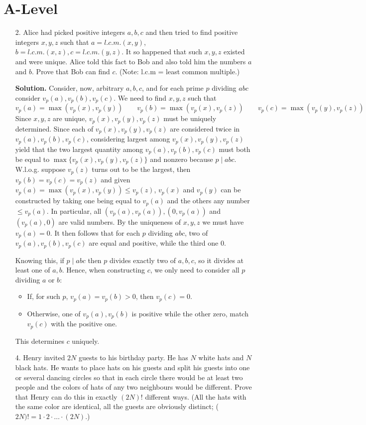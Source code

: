 \documentclass[11pt,a4paper]{article}
\begin{document}
\section*{A-Level}
\begin{enumerate}
	\item[2.] Alice had picked positive integers $a,b,c$ and then tried to find positive integers $x, y, z$ such that $a = l.c.m.(x, y)$, $b = l.c.m.(x, z), c = l.c.m.(y, z)$. 
	It so happened that such $x,y,z$ existed and were unique. 
	Alice told this fact to Bob and also told him the numbers $a$ and $b$. 
	Prove that Bob can find $c$. (Note: l.c.m = least common multiple.)
	
	\textbf{Solution.} Consider, now, arbitrary $a, b, c$, and for each prime $p$ dividing $abc$ consider $v_p(a), v_p(b), v_p(c)$. We need to find $x, y, z$ such that 
	\[
	v_p(a)=\max(v_p(x), v_p(y))\qquad v_p(b)=\max(v_p(x), v_p(z))\qquad v_p(c)=\max(v_p(y), v_p(z))
	\]
	Since $x, y, z$ are unique, $v_p(x), v_p(y), v_p(z)$ must be uniquely determined. 
	Since each of $v_p(x), v_p(y), v_p(z)$ are considered twice in $v_p(a), v_p(b), v_p(c)$, considering largest among $v_p(x), v_p(y), v_p(z)$ yield that the two largest quantity among $v_p(a), v_p(b), v_p(c)$ must both be equal to $\max\{v_p(x), v_p(y), v_p(z)\}$ and nonzero because $p\mid abc$. 
	W.l.o.g. suppose $v_p(z)$ turns out to be the largest, then $v_p(b)=v_p(c)=v_p(z)$ and given $v_p(a)=\max(v_p(x), v_p(y))\le v_p(z)$, $v_p(x)$ and $v_p(y)$ can be constructed by taking one being equal to $v_p(a)$ and the others any number $\le v_p(a)$. In particular, all $(v_p(a), v_p(a)), (0, v_p(a))$ and $(v_p(a), 0)$ are valid numbers. By the uniqueness of $x, y, z$ we must have $v_p(a)=0$. 
	It then follows that for each $p$ dividing $abc$, two of $v_p(a), v_p(b), v_p(c)$ are equal and positive, while the third one 0. 
	
	Knowing this, if $p\mid abc$ then $p$ divides exactly two of $a, b, c$, so it divides at least one of $a, b$. Hence, when constructing $c$, we only need to consider all $p$ dividing $a$ or $b$: 
	\begin{itemize}
		\item If, for such $p$, $v_p(a)=v_p(b)>0$, then $v_p(c)=0$. 
		\item Otherwise, one of $v_p(a), v_p(b)$ is positive while the other zero, match $v_p(c)$ with the positive one. 
	\end{itemize}
	This determines $c$ uniquely. 
	
	\item[4.] Henry invited $2N$ guests to his birthday party. 
	He has $N$ white hats and $N$ black hats. 
	He wants to place hats on his guests and split his guests into one or several dancing circles so that in each circle there would be at least two people and the colors of hats of any two neighbours would be different. 
	Prove that Henry can do this in exactly $(2N)!$ different ways. (All the hats with the same color are identical, all the guests are obviously distinct; ($2N )! = 1 \cdot 2 \cdot\ldots\cdot (2N)$.)
	

\end{enumerate}
\end{document}
